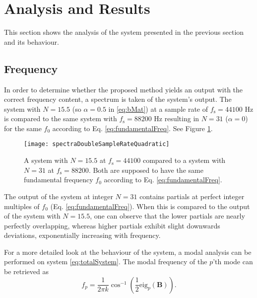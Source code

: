 \section{Analysis and Results}\label{sec:results}
This section shows the analysis of the system presented in the previous section and its behaviour.

\subsection{Frequency}
In order to determine whether the proposed method yields an output with the correct frequency content, a spectrum is taken of the system's output. The system with $N=15.5$ (so $\alpha = 0.5$ in \eqref{eq:bMat}) at a sample rate of $f_\text{s} = 44100$ Hz is compared to the same system with $f_\text{s} = 88200$ Hz resulting in $N=31$ ($\alpha = 0$) for the same $f_0$ according to Eq. \eqref{eq:fundamentalFreq}. See Figure \ref{fig:spectra}.

\begin{figure}[ht]
    \centering
\texttt{[image: spectraDoubleSampleRateQuadratic]}
\caption{\label{fig:spectra}{A system with $N = 15.5$ at $f_\text{s} = 44100$} compared to a system with $N = 31$ at $f_\text{s} = 88200$. Both are supposed to have the same fundamental frequency $f_0$ according to Eq. \eqref{eq:fundamentalFreq}.}
\end{figure} 

The output of the system at integer $N = 31$ contains partials at perfect integer multiples of $f_0$ (Eq. \eqref{eq:fundamentalFreq}). When this is compared to the output of the system with $N = 15.5$, one can observe that the lower partials are nearly perfectly overlapping, whereas higher partials exhibit slight downwards deviations, exponentially increasing with frequency.

For a more detailed look at the behaviour of the system, a modal analysis can be performed on system \eqref{eq:totalSystem}. The modal frequency of the $p$'th mode can be retrieved as
\begin{equation}\label{eq:modalAnalysis}
    f_p = \frac{1}{2\pi k}\cos^{-1}\left(\frac{1}{2}\text{eig}_p(\mathbf{B})\right).
\end{equation}

